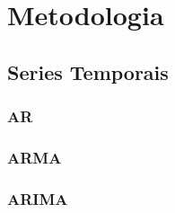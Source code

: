 \chapter{Metodologia}
\label{chap:metodologia}


\section{Series Temporais}

\subsection{AR}

\subsection{ARMA}

\subsection{ARIMA}
